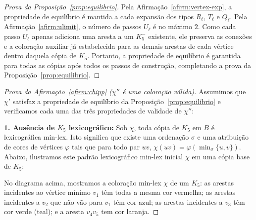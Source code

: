 \documentclass[reqno, 12pt]{amsart}
\numberwithin{equation}{section}
\theoremstyle{plain}
\theoremstyle{definition}
\begin{document}
\begin{proof}[Prova da Proposição~\ref{prop:equilibrio}]
    Pela Afirmação~\ref{afirm:vertex-exp}, a propriedade de equilíbrio é mantida a cada expansão dos tipos $R_\ell$, $T_\ell$ e $Q_\ell$. Pela Afirmação~\ref{afirm:ulimit}, o número de passos $U_\ell$ é no máximo $2$. Como cada passo $U_\ell$ apenas adiciona uma aresta a um $K_5^-$ existente, ele preserva as conexões e a coloração auxiliar já estabelecida para as demais arestas de cada vértice dentro daquela cópia de $K_5$. Portanto, a propriedade de equilíbrio é garantida para todas as cópias após todos os passos de construção, completando a prova da Proposição~\ref{prop:equilibrio}.
\end{proof}

\begin{proof}[Prova da Afirmação~\ref{afirm:chipp} ($\chi''$ é uma coloração válida)]
    Assumimos que $\chi'$ satisfaz a propriedade de equilíbrio da Proposição~\ref{prop:equilibrio} e verificamos cada uma das três propriedades de validade de $\chi''$:

    \medskip
    \noindent\textbf{1. Ausência de $K_5$ lexicográfico:}
    Sob $\chi$, toda cópia de $K_5$ em $B$ é lexicográfica min-lex. Isto significa que existe uma ordenação $\sigma$ e uma atribuição de cores de vértices $\varphi$ tais que para todo par $uv$, $\chi(uv) = \varphi(\min_\sigma\{u,v\})$.
    Abaixo, ilustramos este padrão lexicográfico min-lex inicial $\chi$ em uma cópia base de $K_5$:

    \begin{center}
    \end{center}
    \noindent
    No diagrama acima, mostramos a coloração min-lex $\chi$ de um $K_5$: as arestas incidentes ao vértice mínimo $v_1$ têm todas a mesma cor vermelha; as arestas incidentes a $v_2$ que não vão para $v_1$ têm cor azul; as arestas incidentes a $v_3$ têm cor verde (teal); e a aresta $v_4v_5$ tem cor laranja.


\end{proof}
\end{document}
